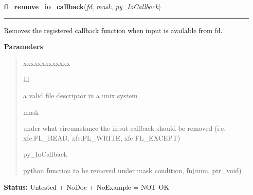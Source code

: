     \label{xformslib:library:fl_remove_io_callback}

    \vspace{0.5ex}

\hspace{.8\funcindent}\begin{boxedminipage}{\funcwidth}

    \raggedright \textbf{fl\_remove\_io\_callback}(\textit{fd}, \textit{mask}, \textit{py\_IoCallback})

    \vspace{-1.5ex}

    \rule{\textwidth}{0.5\fboxrule}
\setlength{\parskip}{2ex}
    Removes the registered callback function when input is available from 
    fd.

\setlength{\parskip}{1ex}
      \textbf{Parameters}
      \vspace{-1ex}

      \begin{quote}
        \begin{Ventry}{xxxxxxxxxxxxx}

          \item[fd]

          a valid file descriptor in a unix system

          \item[mask]

          under what circumstance the input callback should be removed 
          (i.e. xfc.FL\_READ, xfc.FL\_WRITE, xfc.FL\_EXCEPT)

          \item[py\_IoCallback]

          python function to be removed under mask condition, fn(num, 
          ptr\_void)

        \end{Ventry}

      \end{quote}

\textbf{Status:} Untested + NoDoc + NoExample = NOT OK



    \end{boxedminipage}

    \label{xformslib:library:fl_add_signal_callback}


